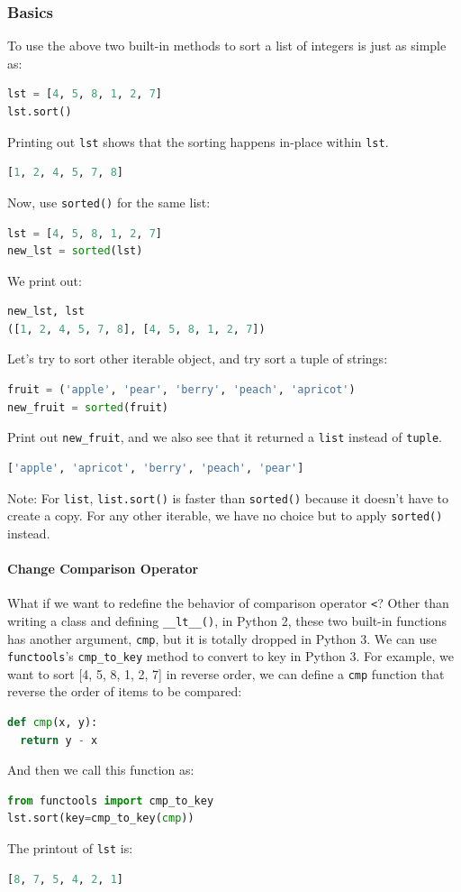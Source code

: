 \documentclass[../main.tex]{subfiles}
\begin{document}
\subsubsection{Basics}
To use the above two built-in methods to sort a list of integers is just as simple as:
\begin{lstlisting}[language=Python]
lst = [4, 5, 8, 1, 2, 7]
lst.sort()
\end{lstlisting}
Printing out \texttt{lst} shows that the sorting happens in-place within \texttt{lst}. 
\begin{lstlisting}[language=Python]
[1, 2, 4, 5, 7, 8]
\end{lstlisting}
Now, use \texttt{sorted()} for the same list:
\begin{lstlisting}[language=Python]
lst = [4, 5, 8, 1, 2, 7]
new_lst = sorted(lst)
\end{lstlisting}
We print out:
\begin{lstlisting}[language=Python]
new_lst, lst
([1, 2, 4, 5, 7, 8], [4, 5, 8, 1, 2, 7])
\end{lstlisting}
Let's try to sort other iterable object, and try sort a tuple of strings:
\begin{lstlisting}[language=Python]
fruit = ('apple', 'pear', 'berry', 'peach', 'apricot')
new_fruit = sorted(fruit)
\end{lstlisting}
Print out \texttt{new\_fruit}, and we also see that it returned a \texttt{list} instead of \texttt{tuple}.
\begin{lstlisting}[language=Python]
['apple', 'apricot', 'berry', 'peach', 'pear']
\end{lstlisting}
Note: For \texttt{list}, \texttt{list.sort()} is faster than \texttt{sorted()} because it doesn't have to create a copy. For any other iterable, we have no choice but to apply \texttt{sorted()} instead.

\paragraph{Change Comparison Operator} What if we want to redefine the behavior of comparison operator \texttt{<}? Other than writing a class and defining \texttt{\_\_lt\_\_()}, in Python 2, these two built-in functions has another argument, \texttt{cmp}, but it is totally dropped in Python 3. We can use \texttt{functools}'s \texttt{cmp\_to\_key} method to convert to key in Python 3. For example, we want to sort [4, 5, 8, 1, 2, 7] in reverse order, we can define a \texttt{cmp} function that reverse the order of items to be compared:
\begin{lstlisting}[language=Python]
def cmp(x, y):
  return y - x
\end{lstlisting}
And then we call this function as:
\begin{lstlisting}[language=Python]
from functools import cmp_to_key
lst.sort(key=cmp_to_key(cmp))
\end{lstlisting}
The printout of \texttt{lst} is:
\begin{lstlisting}[language=Python]
[8, 7, 5, 4, 2, 1]
\end{lstlisting}
\end{document}
